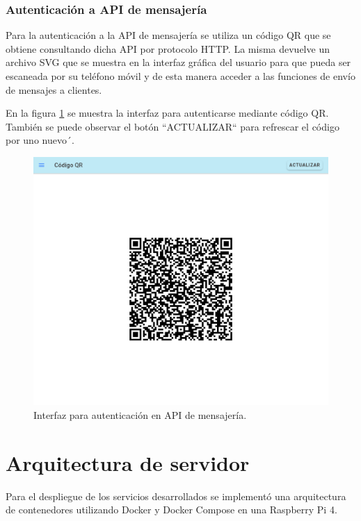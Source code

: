 \subsubsection{Autenticación a API de mensajería}
\label{subsubsec:frontqr}

Para la autenticación a la API de mensajería se utiliza un código QR que se obtiene consultando dicha API por protocolo HTTP. La misma devuelve un archivo SVG que se muestra en la interfaz gráfica del usuario para que pueda ser escaneada por su teléfono móvil y de esta manera acceder a las funciones de envío de mensajes a clientes.

En la figura \ref{fig:frontqr} se muestra la interfaz para autenticarse mediante código QR. También se puede observar el botón ``ACTUALIZAR`` para refrescar el código por uno nuevo´.

\begin{figure}[H]
	\centering
	\includegraphics[scale=.30]{./Figures/qr-page.png}
	\caption{Interfaz para autenticación en API de mensajería.}
	\label{fig:frontqr}
\end{figure}

\section{Arquitectura de servidor}
\label{sec:server}

Para el despliegue de los servicios desarrollados se implementó una arquitectura de contenedores utilizando Docker y Docker Compose en una Raspberry Pi 4.


